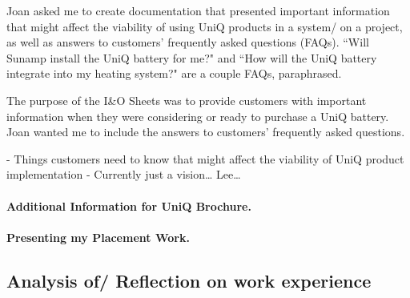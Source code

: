 Joan asked me to create documentation that presented important information that might affect the viability of using UniQ products in a system/ on a project, as well as answers to customers' frequently asked questions (FAQs).
``Will Sunamp install the UniQ battery for me?" and ``How will the UniQ battery integrate into my heating system?" are a couple FAQs, paraphrased.

The purpose of the I\&O Sheets was to provide customers with important information when they were considering or ready to purchase a UniQ battery.
Joan wanted me to include the answers to customers' frequently asked questions.

- Things customers need to know that might affect the viability of UniQ product implementation
- Currently just a vision… Lee…



\paragraph{Additional Information for UniQ Brochure.}



\paragraph{Presenting my Placement Work.}






\subsection{Analysis of/ Reflection on work experience}


